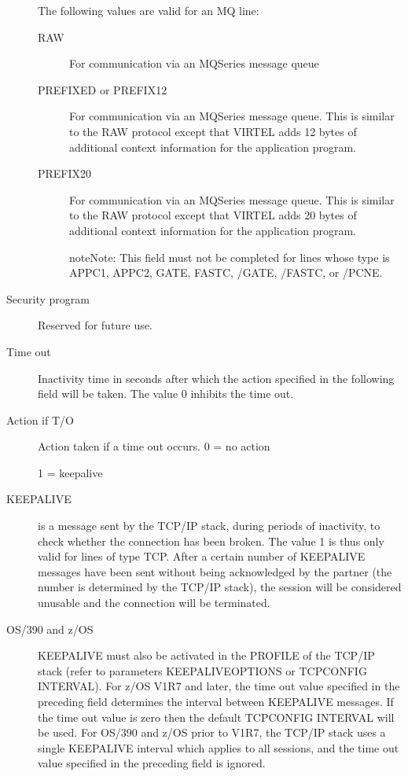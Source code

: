 \documentclass[letterpaper,10pt,english]{sphinxmanual}
\begin{document}
\begin{description}
\begin{description}
\end{description}

The following values are valid for an MQ line:
\begin{description}
\item[{RAW}] \leavevmode
For communication via an MQSeries message queue

\item[{PREFIXED or PREFIX12}] \leavevmode
For communication via an MQSeries message queue. This is similar to
the RAW protocol except that VIRTEL adds 12 bytes of additional
context information for the application program.

\item[{PREFIX20}] \leavevmode
For communication via an MQSeries message queue. This is similar to
the RAW protocol except that VIRTEL adds 20 bytes of additional
context information for the application program.

\begin{sphinxadmonition}{note}{Note:}
This field must not be completed for lines whose type is APPC1, APPC2, GATE, FASTC, /GATE, /FASTC, or /PCNE.
\end{sphinxadmonition}

\end{description}

\item[{Security program}] \leavevmode
Reserved for future use.

\item[{Time out}] \leavevmode
Inactivity time in seconds after which the action specified in the
following field will be taken. The value 0 inhibits the time out.

\item[{Action if T/O}] \leavevmode
Action taken if a time out occurs. 0 = no action

1 = keepalive

\item[{KEEPALIVE}] \leavevmode
is a message sent by the TCP/IP stack, during periods of inactivity,
to check whether the connection has been broken. The value 1 is thus
only valid for lines of type TCP. After a certain number of
KEEPALIVE messages have been sent without being acknowledged by the
partner (the number is determined by the TCP/IP stack), the session
will be considered unusable and the connection will be terminated.

\item[{OS/390 and z/OS}] \leavevmode
KEEPALIVE must also be activated in the PROFILE of the TCP/IP stack
(refer to parameters KEEPALIVEOPTIONS or TCPCONFIG INTERVAL). For
z/OS V1R7 and later, the time out value specified in the preceding
field determines the interval between KEEPALIVE messages. If the
time out value is zero then the default TCPCONFIG INTERVAL will be
used. For OS/390 and z/OS prior to V1R7, the TCP/IP stack uses a
single KEEPALIVE interval which applies to all sessions, and the
time out value specified in the preceding field is ignored.


\end{description}
\end{document}
